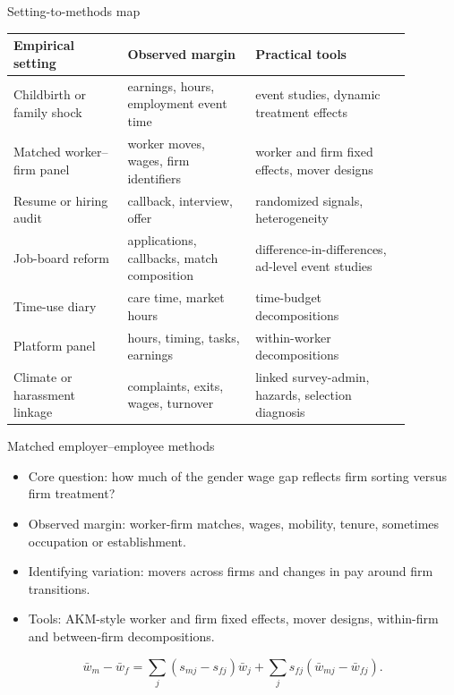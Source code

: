 \documentclass[aspectratio=169,11pt]{beamer}
\begin{document}
\begin{frame}{Setting-to-methods map}
\scriptsize
\begin{tabular}{p{0.25\linewidth} p{0.29\linewidth} p{0.34\linewidth}}
\toprule
Empirical setting & Observed margin & Practical tools \\
\midrule
Childbirth or family shock & earnings, hours, employment event time & event studies, dynamic treatment effects \\
Matched worker--firm panel & worker moves, wages, firm identifiers & worker and firm fixed effects, mover designs \\
Resume or hiring audit & callback, interview, offer & randomized signals, heterogeneity \\
Job-board reform & applications, callbacks, match composition & difference-in-differences, ad-level event studies \\
Time-use diary & care time, market hours & time-budget decompositions \\
Platform panel & hours, timing, tasks, earnings & within-worker decompositions \\
Climate or harassment linkage & complaints, exits, wages, turnover & linked survey-admin, hazards, selection diagnosis \\
\bottomrule
\end{tabular}
\end{frame}

\begin{frame}{Matched employer--employee methods}
\begin{itemize}
    \item Core question: how much of the gender wage gap reflects firm sorting versus firm treatment?
    \item Observed margin: worker-firm matches, wages, mobility, tenure, sometimes occupation or establishment.
    \item Identifying variation: movers across firms and changes in pay around firm transitions.
    \item Tools: AKM-style worker and firm fixed effects, mover designs, within-firm and between-firm decompositions.
\end{itemize}
\vspace{0.2cm}
\[
\bar w_m-\bar w_f =
\sum_j (s_{mj}-s_{fj})\bar w_j
+ \sum_j s_{fj}(\bar w_{mj}-\bar w_{fj}).
\]
\end{frame}
\end{document}
